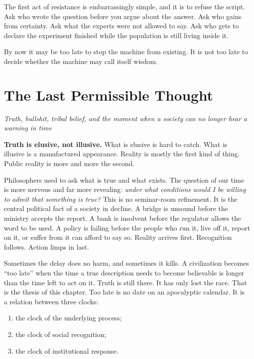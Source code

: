 \documentclass[12pt,a4paper]{book}
\begin{document}
The first act of resistance is embarrassingly simple, and it is to refuse the script. Ask who wrote the question before you argue about the answer. Ask who gains from certainty. Ask what the experts were not allowed to say. Ask who gets to declare the experiment finished while the population is still living inside it.

By now it may be too late to stop the machine from existing. It is not too late to decide whether the machine may call itself wisdom.


\chapter{The Last Permissible Thought}
\label{chap:last-permissible-thought}

\begin{flushleft}
\large\itshape Truth, bullshit, tribal belief, and the moment when a society can no longer hear a warning in time
\end{flushleft}
\vspace{1.2em}

\noindent\textbf{Truth is elusive, not illusive.} What is elusive is hard to catch. What is illusive is a manufactured appearance. Reality is mostly the first kind of thing. Public reality is more and more the second.

Philosophers used to ask what is true and what exists. The question of our time is more nervous and far more revealing: \emph{under what conditions would I be willing to admit that something is true?} This is no seminar-room refinement. It is the central political fact of a society in decline. A bridge is unsound before the ministry accepts the report. A bank is insolvent before the regulator allows the word to be used. A policy is failing before the people who run it, live off it, report on it, or suffer from it can afford to say so. Reality arrives first. Recognition follows. Action limps in last.

Sometimes the delay does no harm, and sometimes it kills. A civilization becomes ``too late'' when the time a true description needs to become believable is longer than the time left to act on it. Truth is still there. It has only lost the race. That is the thesis of this chapter. Too late is no date on an apocalyptic calendar. It is a relation between three clocks:

\begin{enumerate}
  \item the clock of the underlying process;
  \item the clock of social recognition;
  \item the clock of institutional response.
\end{enumerate}
\end{document}
